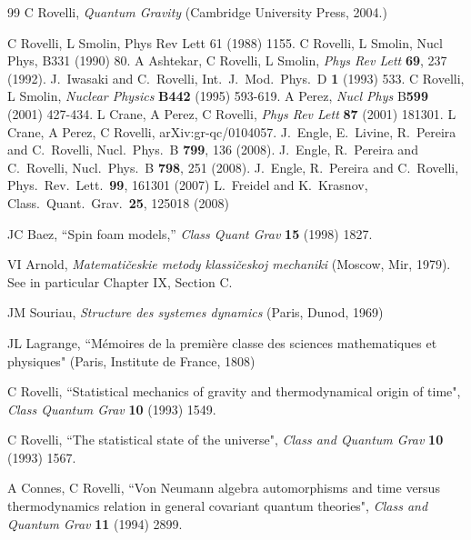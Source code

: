 \documentclass[10pt,nofootinbib]{revtex4}
\begin{document}
\begin{thebibliography}{99}
 C Rovelli, \emph{Quantum Gravity} (Cambridge University Press, 2004.)

 C Rovelli, L Smolin, Phys Rev Lett 61 (1988) 1155.  C Rovelli, L Smolin,  Nucl Phys, B331 (1990) 80.  A Ashtekar, C Rovelli, L Smolin,
\textit{Phys Rev Lett}  {\bf 69}, 237 (1992).
  J.~Iwasaki and C.~Rovelli,  Int.\ J.\ Mod.\ Phys.\  D {\bf 1} (1993) 533.
  C Rovelli, L Smolin, \textit{Nuclear Physics} \textbf{B442} (1995)  593-619. 
A Perez,  \textit{Nucl Phys}  B\textbf{599} (2001) 427-434. %
L Crane, A Perez, C Rovelli,  \textit{Phys  Rev  Lett } \textbf{87} (2001) 181301. %
L Crane, A Perez, C Rovelli, arXiv:gr-qc/0104057.  
  J.~Engle, E.~Livine, R.~Pereira and C.~Rovelli,
  Nucl.\ Phys.\  B {\bf 799}, 136 (2008).
  J.~Engle, R.~Pereira and C.~Rovelli,
  Nucl.\ Phys.\  B {\bf 798}, 251 (2008).
  J.~Engle, R.~Pereira and C.~Rovelli,
  Phys.\ Rev.\ Lett.\  {\bf 99}, 161301 (2007)
    L.~Freidel and K.~Krasnov,
  Class.\ Quant.\ Grav.\  {\bf 25}, 125018 (2008)
  
  JC Baez,
  ``Spin foam models,''
  {\em Class Quant Grav}  {\bf 15}   (1998) 1827.
  
 VI Arnold, {\em Matemati\v{c}eskie metody
klassi\v{c}eskoj mechaniki}  (Moscow, Mir, 1979).  See in particular
Chapter IX, Section C.

 JM Souriau, {\em Structure des systemes dynamics}
(Paris, Dunod, 1969)

 JL Lagrange, ``M\'emoires de la premi\`ere classe
des sciences mathematiques et physiques" (Paris, Institute de France,
1808)

 C Rovelli, ``Statistical mechanics of
gravity and thermodynamical origin of time", {\em Class Quantum Grav}
{\bf 10} (1993) 1549.

C Rovelli,  ``The statistical state of the universe", {\em
Class and Quantum Grav} {\bf 10} (1993) 1567.

 A Connes, C Rovelli, ``Von Neumann algebra
automorphisms and time versus thermodynamics relation in general
covariant quantum theories", {\em Class and Quantum Grav} {\bf 11}
(1994) 2899.  


\end{thebibliography}
\end{document}
